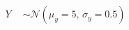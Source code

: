\documentclass[preview]{standalone}
\begin{document}
\begin{align*}
\quad\\Y &\sim \mathcal{N}(\mu_{y} = 5,\,\sigma_{y} = 0.5)
\end{align*}
\end{document}
